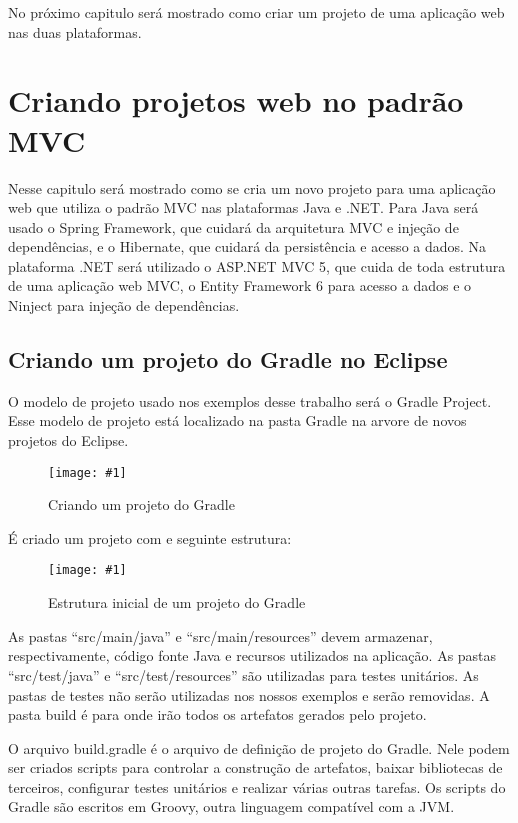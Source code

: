 \documentclass[a4paper,12pt]{article}
\newcommand{\figura}[2] {
	\begin{figure}[ht]
		\centering
		\texttt{[image: \#1]}
		\caption{#2}
	\end{figure}
	\FloatBarrier
}
\newcommand{\groovycode}[1] {
	\inputminted{groovy}{#1}
}
\begin{document}
No próximo capitulo será mostrado como criar um projeto de uma aplicação web nas duas plataformas.

\section{Criando projetos web no padrão MVC}

Nesse capitulo será mostrado como se cria um novo projeto para uma aplicação web que utiliza o padrão MVC nas plataformas Java e .NET. Para Java será usado o Spring Framework, que cuidará da arquitetura MVC e injeção de dependências, e o Hibernate, que cuidará da persistência e acesso a dados. Na plataforma .NET será utilizado o ASP.NET MVC 5, que cuida de toda estrutura de uma aplicação web MVC, o Entity Framework 6 para acesso a dados e o Ninject para injeção de dependências.

\subsection{Criando um projeto do Gradle no Eclipse}

O modelo de projeto usado nos exemplos desse trabalho será o Gradle Project. Esse modelo de projeto está localizado na pasta Gradle na arvore de novos projetos do Eclipse. 

\figura{gradleproject1.png}{Criando um projeto do Gradle}

É criado um projeto com e seguinte estrutura:

\figura{gradleproject1.png}{Estrutura inicial de um projeto do Gradle}

As pastas “src/main/java” e “src/main/resources” devem armazenar, respectivamente, código fonte Java e recursos utilizados na aplicação.  As pastas “src/test/java” e “src/test/resources” são utilizadas para testes unitários. As pastas de testes não serão utilizadas nos nossos exemplos e serão removidas. A pasta build é para onde irão todos os artefatos gerados pelo projeto.

O arquivo build.gradle é o arquivo de definição de projeto do Gradle. Nele podem ser criados scripts para controlar a construção de artefatos, baixar bibliotecas de terceiros, configurar testes unitários e realizar várias outras tarefas. Os scripts do Gradle são escritos em Groovy, outra linguagem compatível com a JVM.

%
\groovycode{code/3.1.build.gradle.txt}
\end{document}
